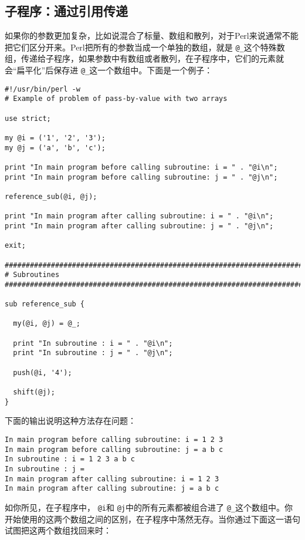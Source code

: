\subsection{子程序：通过引用传递}
如果你的参数更加复杂，比如说混合了标量、数组和散列，对于Perl来说通常不能把它们区分开来。Perl把所有的参数当成一个单独的数组，就是 \verb|@_|这个特殊数组，传递给子程序，如果参数中有数组或者散列，在子程序中，它们的元素就会“扁平化”后保存进 \verb|@_|这一个数组中。下面是一个例子：

\begin{lstlisting}
#!/usr/bin/perl -w
# Example of problem of pass-by-value with two arrays

use strict;

my @i = ('1', '2', '3');
my @j = ('a', 'b', 'c');

print "In main program before calling subroutine: i = " . "@i\n";
print "In main program before calling subroutine: j = " . "@j\n";

reference_sub(@i, @j);

print "In main program after calling subroutine: i = " . "@i\n";
print "In main program after calling subroutine: j = " . "@j\n";

exit;

################################################################################
# Subroutines
################################################################################

sub reference_sub {

  my(@i, @j) = @_;

  print "In subroutine : i = " . "@i\n";
  print "In subroutine : j = " . "@j\n";

  push(@i, '4');

  shift(@j);
}
\end{lstlisting}

下面的输出说明这种方法存在问题：

\begin{lstlisting}
In main program before calling subroutine: i = 1 2 3
In main program before calling subroutine: j = a b c
In subroutine : i = 1 2 3 a b c
In subroutine : j = 
In main program after calling subroutine: i = 1 2 3
In main program after calling subroutine: j = a b c
\end{lstlisting}

如你所见，在子程序中， \verb|@i|和 \verb|@j|中的所有元素都被组合进了 \verb|@_|这个数组中。你开始使用的这两个数组之间的区别，在子程序中荡然无存。当你通过下面这一语句试图把这两个数组找回来时：

